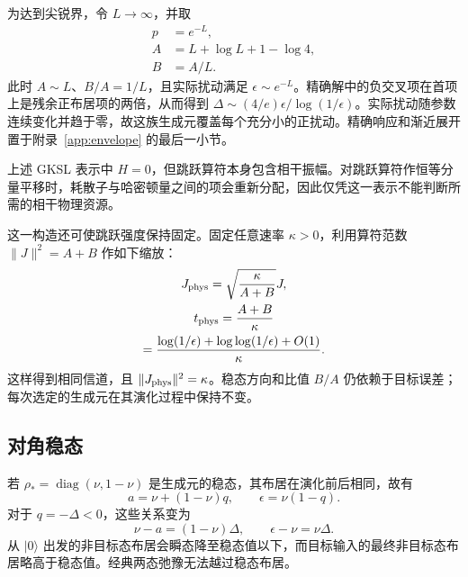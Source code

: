 \documentclass[aps,pra,reprint,amsmath,amssymb,nofootinbib,floatfix,longbibliography]{revtex4-2}
\theoremstyle{aps}
\DeclareMathOperator{\diag}{diag}
\newcommand{\eps}{\epsilon}
\newcommand{\ket}[1]{|#1\rangle}
\begin{document}
为达到尖锐界，令 $L\to\infty$，并取
\begin{equation}\label{eq:familyparams}
 \begin{aligned}
 p&=e^{-L},\\
 A&=L+\log L+1-\log4,\\
 B&=A/L.
 \end{aligned}
\end{equation}
此时 $A\sim L$、$B/A=1/L$，且实际扰动满足 $\eps\sim e^{-L}$。精确解中的负交叉项在首项上是残余正布居项的两倍，从而得到 $\Delta\sim(4/e)\eps/\log(1/\eps)$。实际扰动随参数连续变化并趋于零，故这族生成元覆盖每个充分小的正扰动。精确响应和渐近展开置于附录~\ref{app:envelope} 的最后一小节。

上述 GKSL 表示中 $H=0$，但跳跃算符本身包含相干振幅。对跳跃算符作恒等分量平移时，耗散子与哈密顿量之间的项会重新分配，因此仅凭这一表示不能判断所需的相干物理资源。

这一构造还可使跳跃强度保持固定。固定任意速率 $\kappa>0$，利用算符范数 $\|J\|^2=A+B$ 作如下缩放：
\begin{equation}\label{eq:fixed-strength}
 \begin{gathered}
 J_{\rm phys}=\sqrt{\frac{\kappa}{A+B}}J,\\
 t_{\rm phys}=\frac{A+B}{\kappa}
 \\=\frac{\log(1/\eps)+\log\log(1/\eps)+O(1)}{\kappa}.
 \end{gathered}
\end{equation}
这样得到相同信道，且 $\|J_{\rm phys}\|^2=\kappa$。稳态方向和比值 $B/A$ 仍依赖于目标误差；每次选定的生成元在其演化过程中保持不变。

\subsection{对角稳态}

若 $\rho_*=\diag(\nu,1-\nu)$ 是生成元的稳态，其布居在演化前后相同，故有
\begin{equation}\label{eq:diagonal-exact}
 a=\nu+(1-\nu)q,\qquad \eps=\nu(1-q).
\end{equation}
对于 $q=-\Delta<0$，这些关系变为
\begin{equation}\label{eq:overshoot}
 \nu-a=(1-\nu)\Delta,\qquad \eps-\nu=\nu\Delta.
\end{equation}
从 $\ket0$ 出发的非目标态布居会瞬态降至稳态值以下，而目标输入的最终非目标态布居略高于稳态值。经典两态弛豫无法越过稳态布居。
\end{document}
